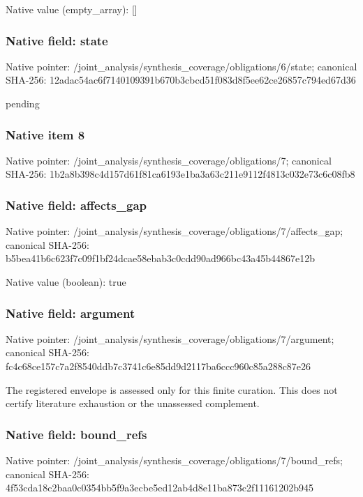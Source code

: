 \documentclass[10pt,a4paper]{article}
\begin{document}
Native value (empty\_\allowbreak{}array): []

\subsubsection{Native field: state}
Native pointer: /joint\_\allowbreak{}analysis/synthesis\_\allowbreak{}coverage/obligations/6/state; canonical SHA-256: 12adac54ac6f7140109391b670b3cbcd51f083d8f5ee62ce26857c794ed67d36

\begingroup\raggedright\sloppy pending\par\endgroup

\subsubsection{Native item 8}
Native pointer: /joint\_\allowbreak{}analysis/synthesis\_\allowbreak{}coverage/obligations/7; canonical SHA-256: 1b2a8b398c4d157d61f81ca6193e1ba3a63c211e9112f4813c032e73c6c08fb8

\subsubsection{Native field: affects\_\allowbreak{}gap}
Native pointer: /joint\_\allowbreak{}analysis/synthesis\_\allowbreak{}coverage/obligations/7/affects\_\allowbreak{}gap; canonical SHA-256: b5bea41b6c623f7c09f1bf24dcae58ebab3c0cdd90ad966bc43a45b44867e12b

Native value (boolean): true

\subsubsection{Native field: argument}
Native pointer: /joint\_\allowbreak{}analysis/synthesis\_\allowbreak{}coverage/obligations/7/argument; canonical SHA-256: fc4c68ce157c7a2f8540ddb7c3741c6e85dd9d2117ba6ccc960c85a288c87e26

\begingroup\raggedright\sloppy The registered envelope is assessed only for this finite curation. This does not certify literature exhaustion or the unassessed complement.\par\endgroup

\subsubsection{Native field: bound\_\allowbreak{}refs}
Native pointer: /joint\_\allowbreak{}analysis/synthesis\_\allowbreak{}coverage/obligations/7/bound\_\allowbreak{}refs; canonical SHA-256: 4f53cda18c2baa0c0354bb5f9a3ecbe5ed12ab4d8e11ba873c2f11161202b945
\end{document}
